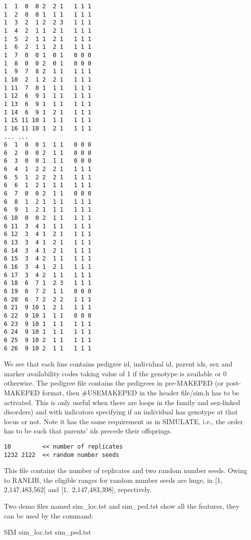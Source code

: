 \documentclass[12pt]{article}
\begin{document}
\bigskip{}
\begin{verbatim}
1  1  0  0 2  2 1   1 1 1
1  2  0  0 1  1 1   1 1 1
1  3  2  1 2  2 3   1 1 1
1  4  2  1 1  2 1   1 1 1
1  5  2  1 1  2 1   1 1 1
1  6  2  1 1  2 1   1 1 1
1  7  0  0 1  0 1   0 0 0
1  8  0  0 2  0 1   0 0 0
1  9  7  8 2  1 1   1 1 1
1 10  2  1 2  2 1   1 1 1
1 11  7  8 1  1 1   1 1 1
1 12  6  9 1  1 1   1 1 1
1 13  6  9 1  1 1   1 1 1
1 14  6  9 1  2 1   1 1 1
1 15 11 10 1  1 1   1 1 1
1 16 11 10 1  2 1   1 1 1
... ...
6  1  0  0 1  1 1   0 0 0
6  2  0  0 2  1 1   0 0 0
6  3  0  0 1  1 1   0 0 0
6  4  1  2 2  2 1   1 1 1
6  5  1  2 2  2 1   1 1 1
6  6  1  2 1  1 1   1 1 1
6  7  0  0 2  1 1   0 0 0
6  8  1  2 1  1 1   1 1 1
6  9  1  2 1  1 1   1 1 1
6 10  0  0 2  1 1   1 1 1
6 11  3  4 1  1 1   1 1 1
6 12  3  4 1  2 1   1 1 1
6 13  3  4 1  2 1   1 1 1
6 14  3  4 1  2 1   1 1 1
6 15  3  4 2  1 1   1 1 1
6 16  3  4 1  2 1   1 1 1
6 17  3  4 2  1 1   1 1 1
6 18  6  7 1  2 3   1 1 1
6 19  6  7 2  1 1   0 0 0
6 20  6  7 2  2 2   1 1 1
6 21  9 10 1  2 1   1 1 1
6 22  9 10 1  1 1   0 0 0
6 23  9 10 1  1 1   1 1 1
6 24  9 10 1  1 1   1 1 1
6 25  9 10 2  1 1   1 1 1
6 26  9 10 2  1 1   1 1 1
\end{verbatim}

We see that each line contains pedigree id, individual id, parent ids, sex and marker
availability codes taking value of 1 if the genotype is available or 0 otherwise.
The pedigree file contains the pedigrees in pre-MAKEPED (or post-MAKEPED format, then
\#USEMAKEPED in the header file/sim.h has to be activated. This is only useful when 
there are loops in the family and sex-linked disorders) and with indicators specifying if an individual
has genotype at that locus or not. Note it has the same requirement as in SIMULATE, 
i.e., the order has to be such that parents' ids precede their offsprings.

\bigskip{}
\begin{verbatim}
10         << number of replicates
1232 2122  << random number seeds
\end{verbatim}

This file contains the number of replicates and two random number seeds. Owing to RANLIB,
the eligible ranges for random number seeds are huge, in [1,$\,$ 2,147,483,562] and 
[1,$\,$ 2,147,483,398], repectively.

Two demo files named sim\_loc.tst and sim\_ped.tst show all the features, they can be used
by the command:

\bigskip
SIM sim\_loc.tst sim\_ped.tst
\bigskip
\end{document}
